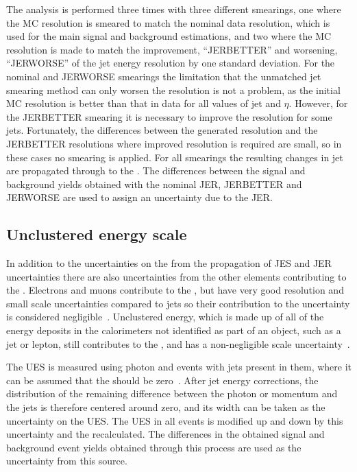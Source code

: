 The analysis is performed three times with three different smearings, one where the MC resolution is smeared to match the nominal data resolution, which is used for the main signal and background estimations, and two where the \ac{MC} resolution is made to match the improvement, ``JERBETTER'' and worsening, ``JERWORSE'' of the jet energy resolution by one standard deviation. For the nominal and JERWORSE smearings the limitation that the unmatched jet smearing method can only worsen the resolution is not a problem, as the initial \ac{MC} resolution is better than that in data for all values of jet \pt and $\eta$. However, for the JERBETTER smearing it is necessary to improve the resolution for some jets. Fortunately, the differences between the generated resolution and the JERBETTER resolutions where improved resolution is required are small, so in these cases no smearing is applied. For all smearings the resulting changes in jet \pt are propagated through to the \MET. The differences between the signal and background yields obtained with the nominal \ac{JER}, JERBETTER and JERWORSE are used to assign an uncertainty due to the \ac{JER}.

\subsection{Unclustered energy scale}
\label{sec:promptues}
In addition to the uncertainties on the \MET from the propagation of \ac{JES} and \ac{JER} uncertainties there are also uncertainties from the other elements contributing to the \MET. Electrons and muons contribute to the \MET, but have very good resolution and small scale uncertainties compared to jets so their contribution to the \MET uncertainty is considered negligible~\cite{CMS-PAS-JME-12-002}. Unclustered energy, which is made up of all of the energy deposits in the calorimeters not identified as part of an object, such as a jet or lepton, still contributes to the \MET, and has a non-negligible scale uncertainty~\cite{CMS-PAS-JME-12-002}. %

The \ac{UES} is measured using photon and \PZ events with jets present in them, where it can be assumed that the \MET should be zero~\cite{CMS-PAS-JME-12-002}. After jet energy corrections, the distribution of the remaining difference between the photon or \PZ momentum and the jets is therefore centered around zero, and its width can be taken as the uncertainty on the \ac{UES}. The \ac{UES} in all events is modified up and down by this uncertainty and the \MET recalculated. The differences in the obtained signal and background event yields obtained through this process are used as the uncertainty from this source.

